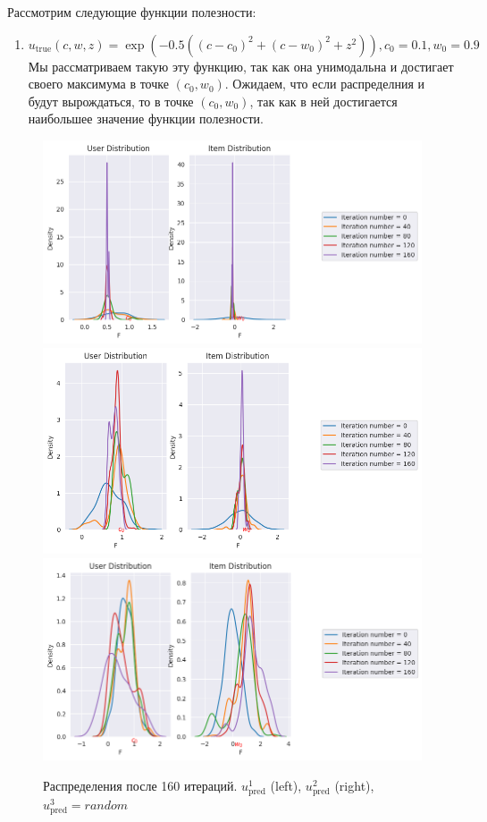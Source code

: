 \documentclass{article}
\begin{document}
Рассмотрим следующие функции полезности:
\begin{enumerate}
\item$u_{\text{true}}(c, w, z) = \exp{(-0.5((c - c_0)^2 + (c - w_0)^2 + z^2))}, c_0 = 0.1, w_0 = 0.9 $\\
Мы рассматриваем такую эту функцию, так как она унимодальна и достигает своего максимума в точке $(c_0, w_0)$.
Ожидаем, что если распределния и будут вырождаться, то в точке $(c_0, w_0)$, так как в ней достигается наибольшее значение функции полезности. 
\end{enumerate}


\begin{figure}[h!]
    \centering
    \includegraphics[width=0.49\linewidth]{images/21_05_exp_uni/distr_case_1.png}
    \includegraphics[width=0.49\linewidth]{images/21_05_exp_uni/distr_case_2.png}
    \includegraphics[width=0.49\linewidth]{images/21_05_exp_uni/distr_random.png}
    \caption{Распределения после 160 итераций.  $u^1_{\text{pred}}$ (left), $u^2_{\text{pred}}$ (right), $u^3_{\text{pred}}=random$}
    \label{distributions_1}
\end{figure}
\end{document}

